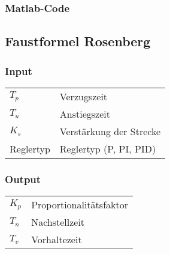 \subsubsection*{Matlab-Code}



\subsection{Faustformel Rosenberg}

\subsubsection*{Input}

\begin{tabular}{p{40mm}l}
    $ T_p $        & Verzugszeit \\
    $ T_u $        & Anstiegszeit \\
    $ K_s $        & Verst\"arkung der Strecke \\
      Reglertyp    & Reglertyp (P, PI, PID)
\end{tabular}

\subsubsection*{Output}
\begin{tabular}{p{40mm}l}
    $ K_p $ & Proportionalit\"atsfaktor \\
    $ T_n $ & Nachstellzeit \\
    $ T_v $ & Vorhaltezeit
\end{tabular}

